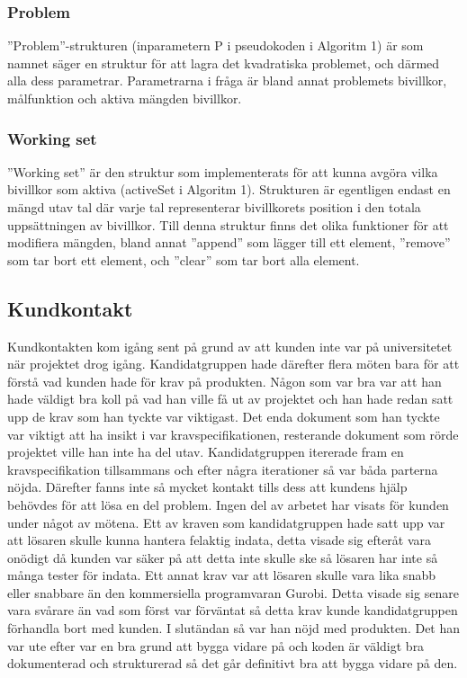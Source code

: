 \subsubsection{Problem}
''Problem''-strukturen (inparametern P i pseudokoden i Algoritm 1) är som namnet säger en struktur för att lagra det kvadratiska problemet, och därmed alla dess parametrar. Parametrarna i fråga är bland annat problemets bivillkor, målfunktion och aktiva mängden bivillkor.

\subsubsection{Working set}
''Working set'' är den struktur som implementerats för att kunna avgöra vilka bivillkor som aktiva (activeSet i Algoritm 1). Strukturen är egentligen endast en mängd utav tal där varje tal representerar bivillkorets position i den totala uppsättningen av bivillkor. Till denna struktur finns det olika funktioner för att modifiera mängden, bland annat ''append'' som lägger till ett element, ''remove'' som tar bort ett element, och ''clear'' som tar bort alla element.




\subsection{Kundkontakt}
Kundkontakten kom igång sent på grund av att kunden inte var på universitetet när projektet drog igång. Kandidatgruppen hade därefter flera möten bara för att förstå vad kunden hade för krav på produkten. Någon som var bra var att han hade väldigt bra koll på vad han ville få ut av projektet och han hade redan satt upp de krav som han tyckte var viktigast. Det enda dokument som han tyckte var viktigt att ha insikt i var kravspecifikationen, resterande dokument som rörde projektet ville han inte ha del utav. Kandidatgruppen itererade fram en kravspecifikation tillsammans och efter några iterationer så var båda parterna nöjda. Därefter fanns inte så mycket kontakt tills dess att kundens hjälp behövdes för att lösa en del problem. Ingen del av arbetet har visats för kunden under något av mötena. 
\newline
\newline
Ett av kraven som kandidatgruppen hade satt upp var att lösaren skulle kunna hantera felaktig indata, detta visade sig efteråt vara onödigt då kunden var säker på att detta inte skulle ske så lösaren har inte så många tester för indata. Ett annat krav var att lösaren skulle vara lika snabb eller snabbare än den kommersiella programvaran Gurobi. Detta visade sig senare vara svårare än vad som först var förväntat så detta krav kunde kandidatgruppen förhandla bort med kunden. I slutändan så var han nöjd med produkten. Det han var ute efter var en bra grund att bygga vidare på och koden är väldigt bra dokumenterad och strukturerad så det går definitivt bra att bygga vidare på den. 

